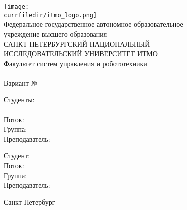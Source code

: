 \begin{titlepage}
    \begin{center}
        \ifdefined\logo
            \logo
        \else
            \texttt{[image: \\currfiledir/itmo\_logo.png]}
        \fi\\[10pt]
        Федеральное государственное автономное образовательное \\ учреждение высшего образования \\[6pt]
        САНКТ-ПЕТЕРБУРГСКИЙ НАЦИОНАЛЬНЫЙ \\ ИССЛЕДОВАТЕЛЬСКИЙ УНИВЕРСИТЕТ ИТМО \\[16pt]
        Факультет систем управления и робототехники \vfill
        {\large \worktype} \\[0.5em]
        {\large \textbf{\MakeUppercase{\workname}}}\\[0.5em]
        \ifdefined\varnum
            Вариант №\varnum
        \fi
    \end{center}\vfill
    \begin{flushright}
        \ifdefined\students
            \begin{minipage}{0.3\textwidth}
                Студенты:\\\students
                \ifdefined\studystream
                    \\ Поток: \studystream
                \fi
                \ifdefined\groupnumber
                    \\ Группа: \groupnumber
                \fi \\[0.5em]
                Преподаватель: \teachername
            \end{minipage}
        \else
            Студент: \studentname
            \ifdefined\studystream
                \\ Поток: \studystream
            \fi
            \ifdefined\groupnumber
                \\ Группа: \groupnumber
            \fi \\[0.5em]
            Преподаватель: \teachername
        \fi
    \end{flushright}\vfill
    \begin{center}
        {\small Санкт-Петербург \\ \ifdefined\copyrightyear \copyrightyear \else \the\year \fi}
    \end{center}
\end{titlepage}
\setcounter{page}{2}
\ifshowTOC
    \tableofcontents\newpage
\fi
